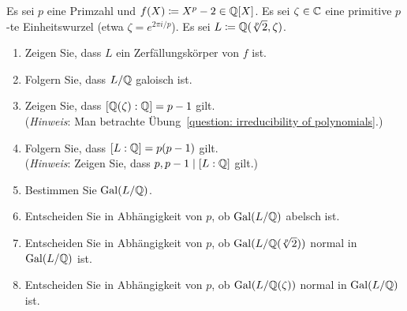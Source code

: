 \begin{question}[subtitle = Galoisgruppe von $X^p - 2$]
  Es sei $p$ eine Primzahl und $f(X) \coloneqq X^p - 2 \in \mathbb{Q}[X]$.
  Es sei $\zeta \in \mathbb{C}$ eine primitive $p$-te Einheitswurzel (etwa $\zeta = e^{2 \pi i/p}$).
  Es sei $L \coloneqq \mathbb{Q}(\sqrt[p]{2}, \zeta)$.
  \begin{enumerate}
    \item
      Zeigen Sie, dass $L$ ein Zerfällungskörper von $f$ ist.
    \item
      Folgern Sie, dass $L/\mathbb{Q}$ galoisch ist.
    \item
      Zeigen Sie, dass $[\mathbb{Q}(\zeta) : \mathbb{Q}] = p-1$ gilt.
      \\
      (\emph{Hinweis}:
       Man betrachte Übung~\ref{question: irreducibility of polynomials}.)
    \item
      Folgern Sie, dass $[L : \mathbb{Q}] = p(p-1)$ gilt.
      \\
      (\emph{Hinweis}:
       Zeigen Sie, dass $p, p-1 \mid [L : \mathbb{Q}]$ gilt.)
    \item
      Bestimmen Sie $\operatorname{Gal}(L / \mathbb{Q})$.
    \item
      Entscheiden Sie in Abhängigkeit von $p$, ob $\operatorname{Gal}(L / \mathbb{Q})$ abelsch ist.
    \item
      Entscheiden Sie in Abhängigkeit von $p$, ob $\operatorname{Gal}(L / \mathbb{Q}(\sqrt[p]{2}))$ normal in $\operatorname{Gal}(L/\mathbb{Q})$ ist.
    \item
      Entscheiden Sie in Abhängigkeit von $p$, ob $\operatorname{Gal}(L / \mathbb{Q}(\zeta))$ normal in $\operatorname{Gal}(L/\mathbb{Q})$ ist.
  \end{enumerate}
\end{question}


